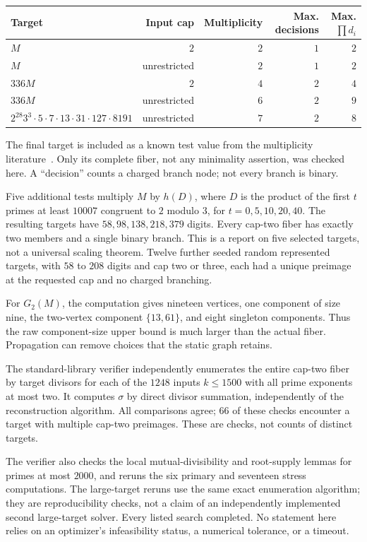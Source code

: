 \documentclass[11pt]{article}
\begin{document}
\begin{center}
\begin{tabular}{@{}lrrrr@{}}
\toprule
Target & Input cap & Multiplicity & Max. decisions & Max. $\prod d_i$\\
\midrule
$M$ & $2$ & $2$ & $1$ & $2$\\
$M$ & unrestricted & $2$ & $1$ & $2$\\
$336M$ & $2$ & $4$ & $2$ & $4$\\
$336M$ & unrestricted & $6$ & $2$ & $9$\\
$2^{28}3^3\cdot5\cdot7\cdot13\cdot31\cdot127\cdot8191$
 & unrestricted & $7$ & $2$ & $8$\\
\bottomrule
\end{tabular}
\end{center}
The final target is included as a known test value from the multiplicity literature~\cite{kominers}. Only its complete fiber, not any minimality assertion, was checked here. A ``decision'' counts a charged branch node; not every branch is binary.

Five additional tests multiply $M$ by $h(D)$, where $D$ is the product of the first $t$ primes at least $10007$ congruent to $2$ modulo $3$, for $t=0,5,10,20,40$. The resulting targets have $58,98,138,218,379$ digits. Every cap-two fiber has exactly two members and a single binary branch. This is a report on five selected targets, not a universal scaling theorem. Twelve further seeded random represented targets, with $58$ to $208$ digits and cap two or three, each had a unique preimage at the requested cap and no charged branching.

For $G_2(M)$, the computation gives nineteen vertices, one component of size nine, the two-vertex component $\{13,61\}$, and eight singleton components. Thus the raw component-size upper bound is much larger than the actual fiber. Propagation can remove choices that the static graph retains.

The standard-library verifier independently enumerates the entire cap-two fiber by target divisors for each of the $1248$ inputs $k\le1500$ with all prime exponents at most two. It computes $\sigma$ by direct divisor summation, independently of the reconstruction algorithm. All comparisons agree; $66$ of these checks encounter a target with multiple cap-two preimages. These are checks, not counts of distinct targets.

The verifier also checks the local mutual-divisibility and root-supply lemmas for primes at most $2000$, and reruns the six primary and seventeen stress computations. The large-target reruns use the same exact enumeration algorithm; they are reproducibility checks, not a claim of an independently implemented second large-target solver. Every listed search completed. No statement here relies on an optimizer's infeasibility status, a numerical tolerance, or a timeout.
\end{document}
